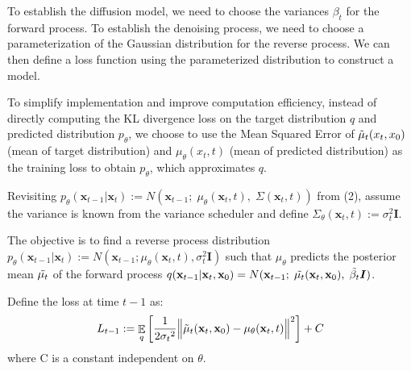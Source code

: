 \documentclass{article}
\DeclareMathOperator{\EX}{\mathbb{E}}%
\begin{document}
To establish the diffusion model, we need to choose the variances $\beta_t$ for the forward process. To establish the denoising process, we need to choose a parameterization of the Gaussian distribution for the reverse process. We can then define a loss function using the parameterized distribution to construct a model. 

To simplify implementation and improve computation efficiency, instead of directly computing the KL divergence loss on the target distribution $q$ and predicted distribution $p_\theta$, we choose to use the Mean Squared Error of $\Tilde{\mu}_t(x_t, x_0)$ (mean of target distribution) and $\mu_\theta(x_t, t)$ (mean of predicted distribution) as the training loss to obtain $p_\theta$, which approximates $q$. 

Revisiting $p_{\theta}(\textbf{x}_{t-1}|\textbf{x}_{t}) :=  N(\textbf{x}_{t-1};\;{\mu}_{\theta}(\textbf{x}_t, t),\;{\Sigma}(\textbf{x}_t, t))$ from (2), assume the variance is known from the variance scheduler and define ${\Sigma_\theta}(\textbf{x}_t, t) := {\sigma}_{t}^2\boldsymbol{I}$. 

The objective is to find a reverse process distribution $p_{\theta}(\textbf{x}_{t-1}|\textbf{x}_{t}) := N(\textbf{x}_{t-1}; {\mu}_{\theta}(\textbf{x}_t, t),  {\sigma}_{t}^2\boldsymbol{I})$ such that ${\mu}_{\theta}$ predicts the posterior mean $\Tilde{\mu_t}$ of the forward process $q(\textbf{x}_{t-1}|\textbf{x}_t, \textbf{x}_0) = N(\textbf{x}_{t-1};\;\Tilde{\mu_t}(\textbf{x}_t, \textbf{x}_0),\; \Tilde{\beta_t}\boldsymbol{I})$. 

Define the loss at time $t-1$ as:
\begin{equation}
    L_{t-1} := \EX_q\left[\frac{1}{2{\sigma_t}^2}
    \Big\lVert {\Tilde\mu_t}(\textbf{x}_t, \textbf{x}_0) - {\mu_\theta}(\textbf{x}_t, t)\Big\rVert^2\right] + C
\end{equation}
where C is a constant independent on $\theta$. 
\end{document}
